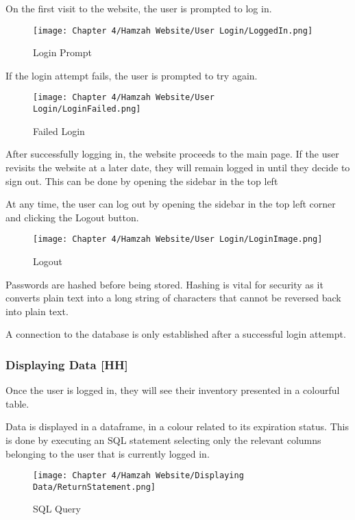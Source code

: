 On the first visit to the website, the user is prompted to log in.

\begin{figure}[H]        
    \centering
    \texttt{[image: Chapter 4/Hamzah Website/User Login/LoggedIn.png]}
    \caption{Login Prompt}
    \label{fig:login}
\end{figure} 

If the login attempt fails, the user is prompted to try again.

\begin{figure}[H]        
    \centering
    \texttt{[image: Chapter 4/Hamzah Website/User Login/LoginFailed.png]}
    \caption{Failed Login}
    \label{fig:loginfail}
\end{figure} 

After successfully logging in, the website proceeds to the main page.
If the user revisits the website at a later date, they will remain logged in until they decide to sign out.
This can be done by opening the sidebar in the top left

At any time, the user can log out by opening the sidebar in the top left corner and clicking the Logout button.

\begin{figure}[H]        
    \centering
    \texttt{[image: Chapter 4/Hamzah Website/User Login/LoginImage.png]}
    \caption{Logout}
    \label{fig:logout}
\end{figure} 
Passwords are hashed before being stored.
Hashing is vital for security as it converts plain text into a long string of characters that cannot be reversed back into plain text.

A connection to the database is only established after a successful login attempt.


\subsubsection{Displaying Data [HH]}

Once the user is logged in, they will see their inventory presented in a colourful table.

Data is displayed in a dataframe, in a colour related to its expiration status.
This is done by executing an SQL statement selecting only the relevant columns belonging to the user that is currently logged in.

\begin{figure}[H]        
    \centering
    \texttt{[image: Chapter 4/Hamzah Website/Displaying Data/ReturnStatement.png]}
    \caption{SQL Query}
    \label{fig:sqlquery}
\end{figure} 

